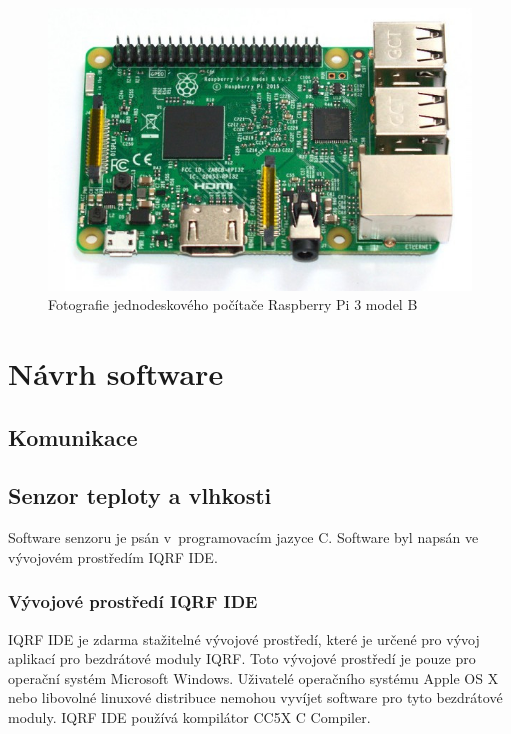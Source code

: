 \documentclass[12pt,a4paper]{article}
\begin{document}
\begin{figure}[H]
\centering
\label{fig:foto/rpi2}
\includegraphics[width = 128mm]{img/foto/rpi3.jpg}
\caption{Fotografie jednodeskového počítače Raspberry Pi 3 model B}
\end{figure}

\newpage

\section{Návrh software}

\subsection{Komunikace}

\subsection{Senzor teploty a vlhkosti}

Software senzoru je psán v~programovacím jazyce C. Software byl napsán ve vývojovém prostředím IQRF IDE\cite{iqrf/ide}.

\subsubsection{Vývojové prostředí IQRF IDE}

IQRF IDE\cite{iqrf/ide} je zdarma stažitelné vývojové prostředí, které je určené pro vývoj aplikací pro bezdrátové moduly IQRF. Toto vývojové prostředí je pouze pro operační systém Microsoft Windows. Uživatelé operačního systému Apple OS X nebo libovolné linuxové distribuce nemohou vyvíjet software pro tyto bezdrátové moduly. IQRF IDE používá kompilátor CC5X C Compiler\cite{cc5x-compiler}.
\end{document}

